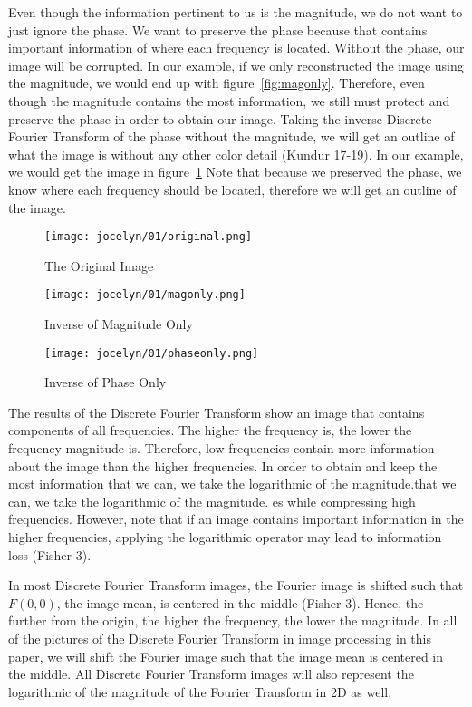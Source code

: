 \documentclass [../article.tex]{subfiles}
\begin{document}
  Even though the information pertinent to us is the magnitude,
  we do not want to just ignore the phase. We want to preserve
  the phase because that contains important information of where
  each frequency is located. Without the phase, our image will be
  corrupted.  In our example, if we only reconstructed the image
  using the magnitude, we would end up with figure~\ref{fig:magonly}.
  Therefore, even though the magnitude contains the most
  information, we still must protect and preserve the phase
  in order to obtain our image. Taking the inverse Discrete Fourier
  Transform of the phase without the magnitude, we will get an
  outline of what the image is without any other color detail
  (Kundur 17-19). In our example, we would get the image in
  figure~\ref{fig:phaseonly} Note that because we
  preserved the phase, we know where each frequency should be
  located, therefore we will get an outline of the image.
  \begin{figure}[!htb]
    \texttt{[image: jocelyn/01/original.png]}
    \caption{The Original Image}
    \label{fig:original1_}
  \endminipage\hfill
    \texttt{[image: jocelyn/01/magonly.png]}
    \caption{Inverse of Magnitude Only}
    \label{fig:magonly}
  \endminipage\hfill
    \texttt{[image: jocelyn/01/phaseonly.png]}
    \caption{Inverse of Phase Only}
    \label{fig:phaseonly}
  \endminipage
  \end{figure}

  The results of the Discrete Fourier Transform show an image
  that contains components of all frequencies.  The higher the
  frequency is, the lower the frequency magnitude is.  Therefore,
  low frequencies contain more information about the image than
  the higher frequencies.  In order to obtain and keep the most
  information that we can, we take the logarithmic of the
  magnitude.that we can, we take the logarithmic of the magnitude.
  es while compressing high frequencies.  However, note that if
  an image contains important information in the higher
  frequencies, applying the logarithmic operator may lead
  to information loss (Fisher 3).

  In most Discrete Fourier Transform images, the Fourier image is
  shifted such that $F(0,0)$, the image mean, is centered in the
  middle (Fisher 3).  Hence, the further from the origin, the
  higher the frequency, the lower the magnitude.  In all of the
  pictures of the Discrete Fourier Transform in image processing in
  this paper, we will shift the Fourier image such that the image
  mean is centered in the middle.  All Discrete Fourier Transform
  images will also represent the logarithmic of the magnitude of the
  Fourier Transform in 2D as well.
\end{document}
